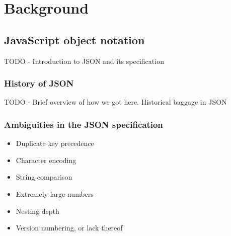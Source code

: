 \documentclass[english, 12pt, a4paper, sci, utf8, a-2b, online]{aaltothesis}
\def\note#1{\begin{flushleft}
	{\color{orange} \raggedright \textsf{#1}}
 \linebreak \noindent
\end{flushleft}}
\begin{document}
%
%
%

\clearpage
\section{Background}


\subsection{JavaScript object notation}
\note{TODO - Introduction to JSON and its specification}


\subsubsection{History of JSON}
\note{TODO - Brief overview of how we got here. Historical baggage in JSON}


\subsubsection{Ambiguities in the JSON specification}
\begin{itemize}
	\item Duplicate key precedence
	\item Character encoding%
	\item String comparison
	\item Extremely large numbers
	\item Nesting depth
	\item Version numbering, or lack thereof
\end{itemize}
\end{document}
